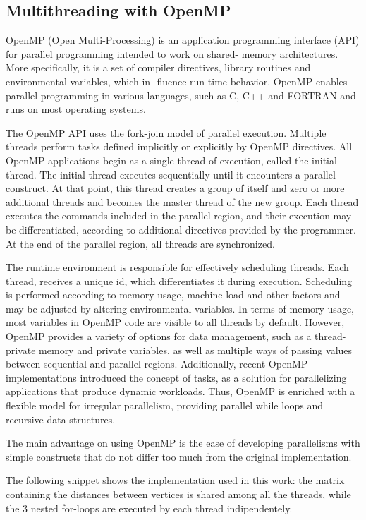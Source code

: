 \subsection{Multithreading with OpenMP}
OpenMP (Open Multi-Processing) is an application programming
interface (API) for parallel programming intended to work on shared-
memory architectures. More specifically, it is a set of compiler
directives, library routines and environmental variables, which in-
fluence run-time behavior. OpenMP enables parallel programming in
various languages, such as C, C++ and FORTRAN and runs on most
operating systems. \par
The OpenMP API uses the fork-join model of parallel execution.
Multiple threads perform tasks defined implicitly or explicitly by
OpenMP directives. All OpenMP applications begin as a single thread
of execution, called the initial thread. The initial thread executes
sequentially until it encounters a parallel construct. At that point,
this thread creates a group of itself and zero or more additional
threads and becomes the master thread of the new group. Each thread
executes the commands included in the parallel region, and their
execution may be differentiated, according to additional directives
provided by the programmer. At the end of the parallel region, all
threads are synchronized. \par
The runtime environment is responsible for effectively scheduling
threads. Each thread, receives a unique id, which differentiates it
during execution. Scheduling is performed according to memory
usage, machine load and other factors and may be adjusted by altering
environmental variables. In terms of memory usage, most variables in
OpenMP code are visible to all threads by default. However, OpenMP
provides a variety of options for data management, such as a thread-
private memory and private variables, as well as multiple ways of
passing values between sequential and parallel regions. Additionally,
recent OpenMP implementations introduced the concept of tasks,
as a solution for parallelizing applications that produce dynamic
workloads. Thus, OpenMP is enriched with a flexible model for
irregular parallelism, providing parallel while loops and recursive
data structures. \par
The main advantage on using OpenMP is the ease of developing parallelisms
with simple constructs that do not differ too much from the original implementation.

The following snippet shows the implementation used in this work: the matrix containing the
distances between vertices is shared among all the threads, while the 3 nested for-loops are executed
by each thread indipendentely.



